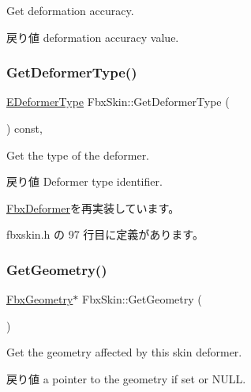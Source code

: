 Get deformation accuracy. \begin{DoxyReturn}{戻り値}
deformation accuracy value. 
\end{DoxyReturn}
\mbox{\label{class_fbx_skin_abaf5fca14c0e8339ea692560fbd494d8}} 
\subsubsection{\texorpdfstring{Get\+Deformer\+Type()}{GetDeformerType()}}
{\footnotesize\ttfamily \hyperlink{class_fbx_deformer_a07e2cfb767191ba5c8799fdfbfe3eaf6}{E\+Deformer\+Type} Fbx\+Skin\+::\+Get\+Deformer\+Type (\begin{DoxyParamCaption}{ }\end{DoxyParamCaption}) const\hspace{0.3cm}{\ttfamily [inline]}, {\ttfamily [virtual]}}

Get the type of the deformer. \begin{DoxyReturn}{戻り値}
Deformer type identifier. 
\end{DoxyReturn}


\hyperlink{class_fbx_deformer_adbc586e383f788f24d7fce9ed859d481}{Fbx\+Deformer}を再実装しています。



 fbxskin.\+h の 97 行目に定義があります。

\mbox{\label{class_fbx_skin_a982b88b989530a1ccb3cca6543c59f9c}} 
\subsubsection{\texorpdfstring{Get\+Geometry()}{GetGeometry()}}
{\footnotesize\ttfamily \hyperlink{class_fbx_geometry}{Fbx\+Geometry}$\ast$ Fbx\+Skin\+::\+Get\+Geometry (\begin{DoxyParamCaption}{ }\end{DoxyParamCaption})}

Get the geometry affected by this skin deformer. \begin{DoxyReturn}{戻り値}
a pointer to the geometry if set or N\+U\+LL. 
\end{DoxyReturn}
\mbox{\label{class_fbx_skin_acd5153c9c43d4a4a659121c4142576ba}} 
